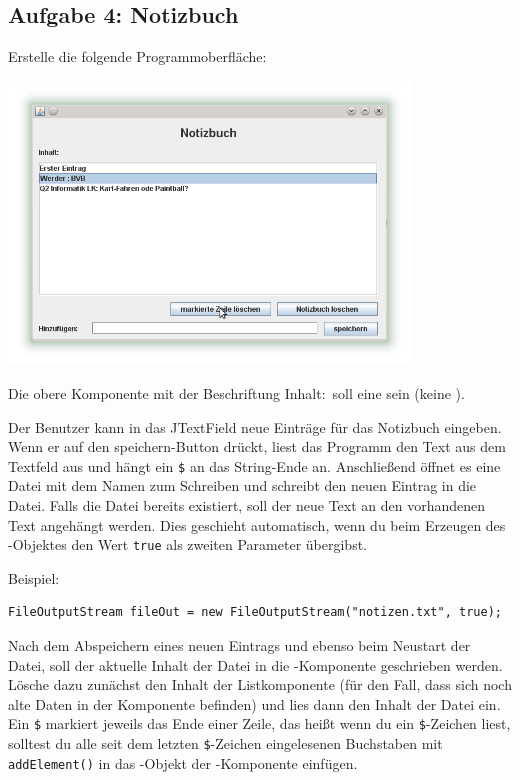 \subsection{Aufgabe 4: Notizbuch}

\begin{compactenum}
\item Erstelle die folgende Programmoberfläche: 

\begin{center}
\includegraphics[width=0.8\textwidth]{./inf/SEKII/27_Java_Dateizugriffe/Notizbuch.png}
\end{center}

Die obere Komponente mit der
Beschriftung \glqq Inhalt:\grqq\ soll eine  sein (keine
).

\item Der Benutzer kann in das JTextField neue Einträge für das Notizbuch
eingeben. Wenn er auf den \glqq speichern\grqq -Button drückt, liest das
Programm den Text aus dem Textfeld aus und hängt ein \lstinline|$| an das
String-Ende an. Anschließend öffnet es eine Datei mit dem Namen
 zum Schreiben und schreibt den neuen Eintrag in die Datei.
Falls die Datei bereits existiert, soll der neue Text an den vorhandenen Text
angehängt werden. Dies geschieht automatisch, wenn du beim Erzeugen des
-Objektes den Wert \lstinline|true| als zweiten
Parameter übergibst.

Beispiel:

\begin{lstlisting}
FileOutputStream fileOut = new FileOutputStream("notizen.txt", true);
\end{lstlisting}

\item Nach dem Abspeichern eines neuen Eintrags und ebenso beim Neustart der
Datei, soll der aktuelle Inhalt der Datei  in die
-Komponente geschrieben werden. Lösche dazu zunächst den Inhalt
der Listkomponente (für den Fall, dass sich noch alte Daten in der Komponente
befinden) und lies dann den Inhalt der Datei ein. Ein \lstinline|$| markiert
jeweils das Ende einer Zeile, das heißt wenn du ein \lstinline|$|-Zeichen liest,
solltest du alle seit dem letzten \lstinline|$|-Zeichen eingelesenen Buchstaben
mit \lstinline|addElement()| in das  -Objekt der
-Komponente einfügen.


\end{compactenum}
